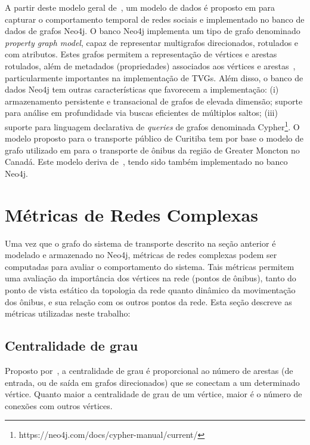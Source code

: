 \textcolor{courb2020}{
A partir deste modelo geral de~\cite{sant:12}, um modelo de dados é proposto em \cite{cat:13} para capturar o comportamento temporal de redes sociais e implementado no banco de dados de grafos Neo4j. O banco Neo4j implementa um tipo de grafo denominado \emph{property graph model}, capaz de representar multigrafos direcionados, rotulados e com atributos. Estes grafos permitem a representação de vértices e arestas rotulados, além de metadados (propriedades) associados aos vértices e arestas~\cite{rod:10}, particularmente importantes na implementação de TVGs. Além disso, o banco de dados Neo4j tem outras características que favorecem a implementação: (i) armazenamento persistente e transacional de grafos de elevada dimensão; suporte para análise em profundidade via buscas eficientes de múltiplos saltos; (iii) suporte para linguagem declarativa de \emph{queries} de grafos denominada Cypher\footnote{https://neo4j.com/docs/cypher-manual/current/}.
}
\textcolor{courb2020}{
O modelo proposto para o transporte público de Curitiba tem por base o modelo de grafo utilizado em \cite{wach:19} para o transporte de ônibus da região de Greater Moncton no Canadá. Este modelo deriva de~\cite{cat:13}, tendo sido também implementado no banco Neo4j.
}

\section{Métricas de Redes Complexas} \label{sec:metr}


Uma vez que o grafo do sistema de transporte descrito na seção anterior é modelado e armazenado no Neo4j, métricas de redes complexas podem ser computadas para avaliar o comportamento do sistema. 
Tais métricas permitem uma avaliação da importância dos vértices na rede (pontos de ônibus), tanto do ponto de vista estático da topologia da rede quanto dinâmico da movimentação dos ônibus, e sua relação com os outros pontos da rede.
Esta seção descreve as métricas utilizadas neste trabalho: 

\subsection{Centralidade de grau}


Proposto por~\cite{free:79}, a centralidade de grau é proporcional ao número de arestas (de entrada, ou de saída em grafos direcionados) que se conectam a um determinado vértice. Quanto maior a centralidade de grau de um vértice, maior é o número de conexões com outros vértices.

